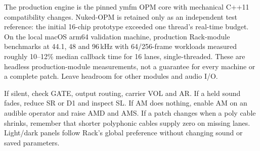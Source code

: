 The production engine is the pinned ymfm OPM core with mechanical C++11
compatibility changes. Nuked-OPM is retained only as an independent test
reference: the initial 16-chip prototype exceeded one thread's real-time
budget. On the local macOS arm64 validation machine, production Rack-module
benchmarks at 44.1, 48 and 96\,kHz with 64/256-frame workloads measured
roughly 10--12\% median callback time for 16 lanes, single-threaded.
These are headless production-module measurements, not a guarantee for every
machine or a complete patch. Leave headroom for other modules and audio I/O.

If silent, check GATE, output routing, carrier VOL and AR. If a held sound
fades, reduce SR or D1 and inspect SL. If AM does nothing, enable AM on an
audible operator and raise AMD and AMS. If a patch changes when a poly cable
shrinks, remember that shorter polyphonic cables supply zero on missing
lanes. Light/dark panels follow Rack's global preference without changing
sound or saved parameters.
